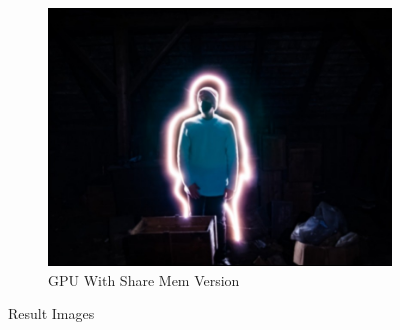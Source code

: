 \documentclass{article}
\begin{document}
\begin{figure}
        \begin{subfigure}[b]{0.5\textwidth}
            \includegraphics[width=\textwidth]{./labwork5-gpu-out-shared.jpg}
            \caption{GPU With Share Mem Version}
        \end{subfigure}
        \caption{Result Images}
\end{figure}
\end{document}
